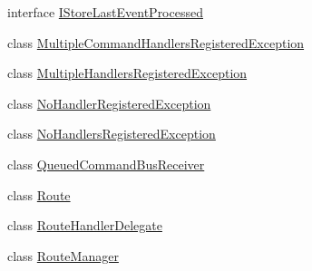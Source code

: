 \begin{DoxyCompactItemize}
interface \hyperlink{interfaceCqrs_1_1Bus_1_1IStoreLastEventProcessed}{I\+Store\+Last\+Event\+Processed}
\item 
class \hyperlink{classCqrs_1_1Bus_1_1MultipleCommandHandlersRegisteredException}{Multiple\+Command\+Handlers\+Registered\+Exception}
\item 
class \hyperlink{classCqrs_1_1Bus_1_1MultipleHandlersRegisteredException}{Multiple\+Handlers\+Registered\+Exception}
\item 
class \hyperlink{classCqrs_1_1Bus_1_1NoHandlerRegisteredException}{No\+Handler\+Registered\+Exception}
\item 
class \hyperlink{classCqrs_1_1Bus_1_1NoHandlersRegisteredException}{No\+Handlers\+Registered\+Exception}
\item 
class \hyperlink{classCqrs_1_1Bus_1_1QueuedCommandBusReceiver}{Queued\+Command\+Bus\+Receiver}
\item 
class \hyperlink{classCqrs_1_1Bus_1_1Route}{Route}
\item 
class \hyperlink{classCqrs_1_1Bus_1_1RouteHandlerDelegate}{Route\+Handler\+Delegate}
\item 
class \hyperlink{classCqrs_1_1Bus_1_1RouteManager}{Route\+Manager}
\end{DoxyCompactItemize}
